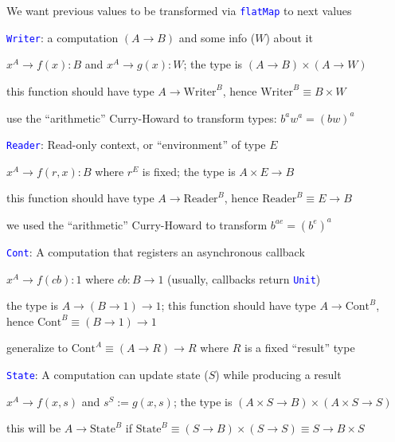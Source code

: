 We want previous values to be transformed via \texttt{\textcolor{blue}{\footnotesize{}flatMap}}
to next values

\texttt{\textcolor{blue}{\footnotesize{}Writer}}: a computation $\left(A\rightarrow B\right)$
and some info ($W$) about it

$x^{A}\rightarrow f(x):B$ and $x^{A}\rightarrow g(x):W$; the type
is $\left(A\rightarrow B\right)\times\left(A\rightarrow W\right)$

this function should have type $A\rightarrow\text{Writer}^{B}$, hence
$\text{Writer}^{B}\equiv B\times W$ 

use the ``arithmetic'' Curry-Howard to transform types: $b^{a}w^{a}=(bw)^{a}$

\texttt{\textcolor{blue}{\footnotesize{}Reader}}: Read-only context,
or ``environment'' of type $E$

$x^{A}\rightarrow f(r,x):B$ where $r^{E}$ is fixed; the type is
$A\times E\rightarrow B$

this function should have type $A\rightarrow\text{Reader}^{B}$, hence
$\text{Reader}^{B}\equiv E\rightarrow B$

we used the ``arithmetic'' Curry-Howard to transform $b^{ae}=(b^{e})^{a}$

\texttt{\textcolor{blue}{\footnotesize{}Cont}}: A computation that
registers an asynchronous callback

$x^{A}\rightarrow f(cb):1$ where $cb:B\rightarrow1$ (usually, callbacks
return \texttt{\textcolor{blue}{\footnotesize{}Unit}})

the type is{\footnotesize{} $A\rightarrow\left(B\rightarrow1\right)\rightarrow1$};
this function should have type {\footnotesize{}$A\rightarrow\text{Cont}^{B}$},
hence{\footnotesize{} $\text{Cont}^{B}\equiv\left(B\rightarrow1\right)\rightarrow1$}{\footnotesize\par}

generalize to {\footnotesize{}$\text{Cont}^{A}\equiv\left(A\rightarrow R\right)\rightarrow R$
}where $R$ is a fixed ``result'' type

\texttt{\textcolor{blue}{\footnotesize{}State}}: A computation can
update state ($S$) while producing a result

$x^{A}\rightarrow f(x,s)$ and $s^{S}:=g(x,s)$; the type is{\footnotesize{}
$\left(A\times S\rightarrow B\right)\times\left(A\times S\rightarrow S\right)$}{\footnotesize\par}

this will be $A\rightarrow\text{State}^{B}$ if {\footnotesize{}$\text{State}^{B}\equiv\left(S\rightarrow B\right)\times\left(S\rightarrow S\right)\equiv S\rightarrow B\times S$ }{\footnotesize\par}


